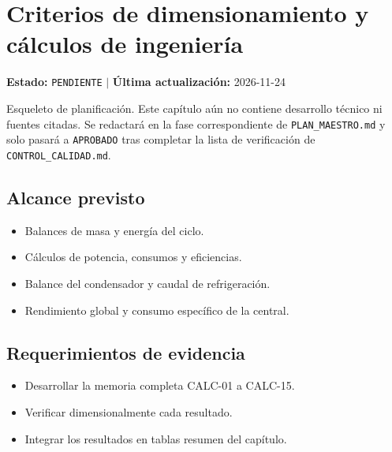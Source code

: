 \chapter{Criterios de dimensionamiento y cálculos de ingeniería}
\label{cap:12}

\begin{cajaestado}
\textbf{Estado:} \texttt{PENDIENTE} \quad$|$\quad
\textbf{Última actualización:} 2026-11-24

Esqueleto de planificación. Este capítulo aún no contiene desarrollo técnico ni
fuentes citadas. Se redactará en la fase correspondiente de
\texttt{PLAN\_MAESTRO.md} y solo pasará a \texttt{APROBADO} tras completar
la lista de verificación de \texttt{CONTROL\_CALIDAD.md}.
\end{cajaestado}

\section{Alcance previsto}
\begin{itemize}
  \item Balances de masa y energía del ciclo.
  \item Cálculos de potencia, consumos y eficiencias.
  \item Balance del condensador y caudal de refrigeración.
  \item Rendimiento global y consumo específico de la central.
\end{itemize}

\section{Requerimientos de evidencia}
\begin{itemize}
  \item Desarrollar la memoria completa CALC-01 a CALC-15.
  \item Verificar dimensionalmente cada resultado.
  \item Integrar los resultados en tablas resumen del capítulo.
\end{itemize}
